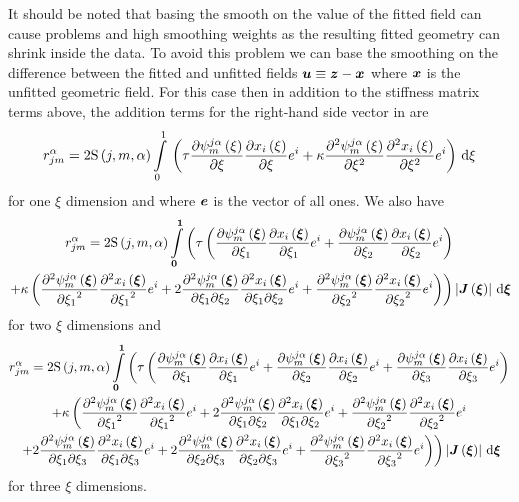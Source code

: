 It should be noted that basing the smooth on the value of the fitted field can
cause problems and high smoothing weights as the resulting fitted geometry can
shrink inside the data. To avoid this problem we can base the smoothing on the
difference between the fitted and unfitted fields \ie
$ \boldsymbol{u} \equiv \boldsymbol{z} - \boldsymbol{x} $ where $ \boldsymbol{x} $ is the unfitted
geometric field. For this case then in addition to the
stiffness matrix terms above, the addition terms for the right-hand side
vector in  are
\begin{equation}
  r^{\alpha}_{jm}=2\idxgsf{j}{m}{\alpha}\gint{0}{1}{\pbrac{
      \tau\delby{\idxgbfn{j}{m}{\alpha}{\xi}}{\xi}\delby{\fnof{x_{i}}{\xi}}{\xi}e^{i}+
  \kappa\deltwosqby{\idxgbfn{j}{m}{\alpha}{\xi}}{\xi}\deltwosqby{\fnof{x_{i}}{\xi}}{\xi}e^{i}}}{\xi}
\end{equation}
for one $\xi$ dimension and where $ \boldsymbol{e} $ is the vector of all ones. We
also have
\begin{multline}
  r^{\alpha}_{jm}=2\idxgsf{j}{m}{\alpha}\dintl{\vect{0}}{\vect{1}}\left(
  \tau\pbrac{\delby{\idxgbfn{j}{m}{\alpha}{\vectr{\xi}}}{\xione}\delby{\fnof{x_{i}}{\vectr{\xi}}}{\xione}e^{i}+
    \delby{\idxgbfn{j}{m}{\alpha}{\vectr{\xi}}}{\xitwo}\delby{\fnof{x_{i}}{\vectr{\xi}}}{\xitwo}e^{i}}\right. \\
  \left.+\kappa\pbrac{\deltwosqby{\idxgbfn{j}{m}{\alpha}{\vectr{\xi}}}{\xione}\deltwosqby{\fnof{x_{i}}{\vectr{\xi}}}{\xione}e^{i}
    +2\deltwoby{\idxgbfn{j}{m}{\alpha}{\vectr{\xi}}}{\xione}{\xitwo}\deltwoby{\fnof{x_{i}}{\vectr{\xi}}}{\xione}{\xitwo}e^{i}
    +\deltwosqby{\idxgbfn{j}{m}{\alpha}{\vectr{\xi}}}{\xitwo}\deltwosqby{\fnof{x_{i}}{\vectr{\xi}}}{\xitwo}e^{i}
  }\right)\abs{\fnof{\matr{J}}{\vectr{\xi}}}\,\exteriorderivop\vect{\xi}
\end{multline}
for two $\xi$ dimensions and
\begin{multline}
  r^{\alpha}_{jm}=2\idxgsf{j}{m}{\alpha}\dintl{\vect{0}}{\vect{1}}\left(
  \tau\pbrac{\delby{\idxgbfn{j}{m}{\alpha}{\vectr{\xi}}}{\xione}\delby{\fnof{x_{i}}{\vectr{\xi}}}{\xione}e^{i}+
    \delby{\idxgbfn{j}{m}{\alpha}{\vectr{\xi}}}{\xitwo}\delby{\fnof{x_{i}}{\vectr{\xi}}}{\xitwo}e^{i}+
    \delby{\idxgbfn{j}{m}{\alpha}{\vectr{\xi}}}{\xithree}\delby{\fnof{x_{i}}{\vectr{\xi}}}{\xithree}e^{i}}\right. \\
  +\kappa\left(\deltwosqby{\idxgbfn{j}{m}{\alpha}{\vectr{\xi}}}{\xione}\deltwosqby{\fnof{x_{i}}{\vectr{\xi}}}{\xione}e^{i}+
  2\deltwoby{\idxgbfn{j}{m}{\alpha}{\vectr{\xi}}}{\xione}{\xitwo}\deltwoby{\fnof{x_{i}}{\vectr{\xi}}}{\xione}{\xitwo}e^{i}+
  \deltwosqby{\idxgbfn{j}{m}{\alpha}{\vectr{\xi}}}{\xitwo}\deltwosqby{\fnof{x_{i}}{\vectr{\xi}}}{\xitwo}e^{i}\right. \\
  \left.\left.+2\deltwoby{\idxgbfn{j}{m}{\alpha}{\vectr{\xi}}}{\xione}{\xithree}\deltwoby{\fnof{x_{i}}{\vectr{\xi}}}{\xione}{\xithree}e^{i}+
  2\deltwoby{\idxgbfn{j}{m}{\alpha}{\vectr{\xi}}}{\xitwo}{\xithree}\deltwoby{\fnof{x_{i}}{\vectr{\xi}}}{\xitwo}{\xithree}e^{i}+
  \deltwosqby{\idxgbfn{j}{m}{\alpha}{\vectr{\xi}}}{\xithree}\deltwosqby{\fnof{x_{i}}{\vectr{\xi}}}{\xithree}e^{i}
  \right)\right)\abs{\fnof{\matr{J}}{\vectr{\xi}}}\,\exteriorderivop\vect{\xi}
\end{multline}
for three $\xi$ dimensions.
